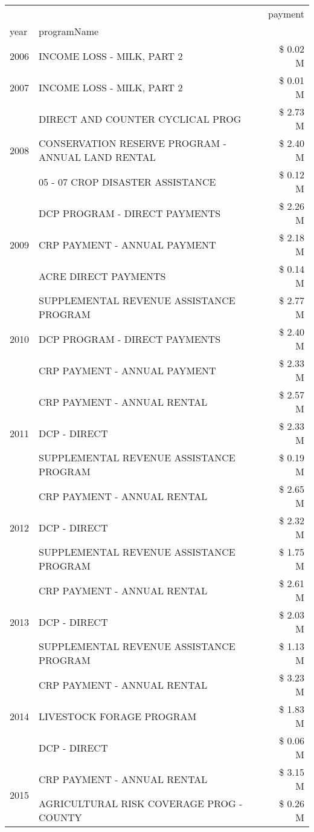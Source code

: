 \begin{tabular}{llr}
\toprule
 &  & payment \\
year & programName &  \\
\midrule
2006 & INCOME LOSS - MILK, PART 2 & \$ 0.02 M \\
\cline{1-3}
2007 & INCOME LOSS - MILK, PART 2 & \$ 0.01 M \\
\cline{1-3}
\multirow[t]{3}{*}{2008} & DIRECT AND COUNTER CYCLICAL PROG & \$ 2.73 M \\
 & CONSERVATION RESERVE PROGRAM - ANNUAL LAND RENTAL & \$ 2.40 M \\
 & 05 - 07 CROP DISASTER ASSISTANCE & \$ 0.12 M \\
\cline{1-3}
\multirow[t]{3}{*}{2009} & DCP PROGRAM - DIRECT PAYMENTS & \$ 2.26 M \\
 & CRP PAYMENT - ANNUAL PAYMENT & \$ 2.18 M \\
 & ACRE DIRECT PAYMENTS & \$ 0.14 M \\
\cline{1-3}
\multirow[t]{3}{*}{2010} & SUPPLEMENTAL REVENUE ASSISTANCE PROGRAM & \$ 2.77 M \\
 & DCP PROGRAM - DIRECT PAYMENTS & \$ 2.40 M \\
 & CRP PAYMENT - ANNUAL PAYMENT & \$ 2.33 M \\
\cline{1-3}
\multirow[t]{3}{*}{2011} & CRP PAYMENT - ANNUAL RENTAL & \$ 2.57 M \\
 & DCP - DIRECT & \$ 2.33 M \\
 & SUPPLEMENTAL REVENUE ASSISTANCE PROGRAM & \$ 0.19 M \\
\cline{1-3}
\multirow[t]{3}{*}{2012} & CRP PAYMENT - ANNUAL RENTAL & \$ 2.65 M \\
 & DCP - DIRECT & \$ 2.32 M \\
 & SUPPLEMENTAL REVENUE ASSISTANCE PROGRAM & \$ 1.75 M \\
\cline{1-3}
\multirow[t]{3}{*}{2013} & CRP PAYMENT - ANNUAL RENTAL & \$ 2.61 M \\
 & DCP - DIRECT & \$ 2.03 M \\
 & SUPPLEMENTAL REVENUE ASSISTANCE PROGRAM & \$ 1.13 M \\
\cline{1-3}
\multirow[t]{3}{*}{2014} & CRP PAYMENT - ANNUAL RENTAL & \$ 3.23 M \\
 & LIVESTOCK FORAGE PROGRAM & \$ 1.83 M \\
 & DCP - DIRECT & \$ 0.06 M \\
\cline{1-3}
\multirow[t]{3}{*}{2015} & CRP PAYMENT - ANNUAL RENTAL & \$ 3.15 M \\
 & AGRICULTURAL RISK COVERAGE PROG - COUNTY & \$ 0.26 M \\

\end{tabular}
